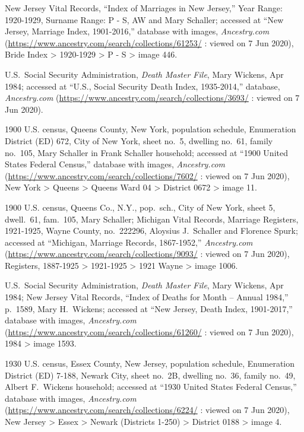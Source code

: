\begin{thebibliography}{999}
New Jersey Vital Records, ``Index of Marriages in New Jersey,'' Year Range: 1920-1929, Surname Range: P - S, AW and Mary Schaller; accessed at ``New Jersey, Marriage Index, 1901-2016,'' database with images, \textit{Ancestry.com} (\url{https://www.ancestry.com/search/collections/61253/} : viewed on 7 Jun 2020), Bride Index > 1920-1929 > P - S > image 446.

U.S.\ Social Security Administration, \textit{Death Master File}, Mary Wickens, Apr 1984; accessed at ``U.S., Social Security Death Index, 1935-2014,'' database, \textit{Ancestry.com} (\url{https://www.ancestry.com/search/collections/3693/} : viewed on 7 Jun 2020).

1900 U.S. census, Queens County, New York, population schedule, Enumeration District (ED) 672, City of New York, sheet no.\ 5, dwelling no.\ 61, family no.\ 105, Mary Schaller in Frank Schaller household; accessed at ``1900 United States Federal Census,'' database with images, \textit{Ancestry.com} (\url{https://www.ancestry.com/search/collections/7602/} : viewed on 7 Jun 2020), New York > Queens > Queens Ward 04 > District 0672 > image 11.

1900 U.S. census, Queens Co., N.Y., pop.\ sch., City of New York, sheet 5, dwell.\ 61, fam.\ 105, Mary Schaller; Michigan Vital Records, Marriage Registers, 1921-1925, Wayne County, no.\ 222296, Aloysius J.\ Schaller and Florence Spurk; accessed at ``Michigan, Marriage Records, 1867-1952,'' \textit{Ancestry.com} (\url{https://www.ancestry.com/search/collections/9093/} : viewed on 7 Jun 2020), Registers, 1887-1925 > 1921-1925 > 1921 Wayne > image 1006.

U.S.\ Social Security Administration, \textit{Death Master File}, Mary Wickens, Apr 1984; New Jersey Vital Records, ``Index of Deaths for Month -- Annual 1984,'' p.\ 1589, Mary H.\ Wickens; accessed at ``New Jersey, Death Index, 1901-2017,'' database with images, \textit{Ancestry.com} (\url{https://www.ancestry.com/search/collections/61260/} : viewed on 7 Jun 2020), 1984 > image 1593.

1930 U.S. census, Essex County, New Jersey, population schedule, Enumeration District (ED) 7-188, Newark City, sheet no.\ 2B, dwelling no.\ 36, family no.\ 49, Albert F.\ Wickens household; accessed at ``1930 United States Federal Census,'' database with images, \textit{Ancestry.com} (\url{https://www.ancestry.com/search/collections/6224/} : viewed on 7 Jun 2020), New Jersey > Essex > Newark (Districts 1-250) > District 0188 > image 4.


\end{thebibliography}
